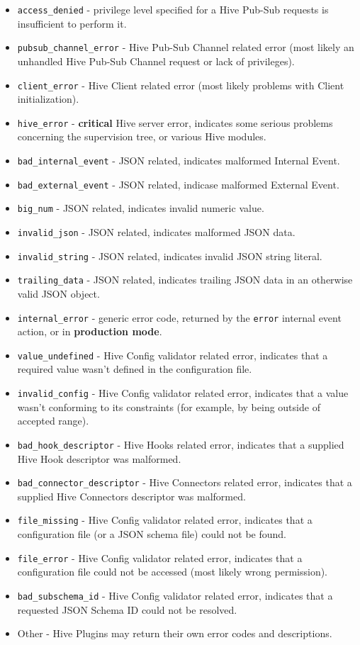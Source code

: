 \documentclass[a4paper]{article}
\begin{document}
\begin{itemize}
\item \texttt{access\_denied} - privilege level specified for a Hive Pub-Sub requests is insufficient to perform it.
\item \texttt{pubsub\_channel\_error} - Hive Pub-Sub Channel related error (most likely an unhandled Hive Pub-Sub Channel request or lack of privileges).
\item \texttt{client\_error} - Hive Client related error (most likely problems with Client initialization).
\item \texttt{hive\_error} - \textbf{critical} Hive server error, indicates some serious problems concerning the supervision tree, or various Hive modules.
\item \texttt{bad\_internal\_event} - JSON related, indicates malformed Internal Event.
\item \texttt{bad\_external\_event} - JSON related, indicase malformed External Event.
\item \texttt{big\_num} - JSON related, indicates invalid numeric value.
\item \texttt{invalid\_json} - JSON related, indicates malformed JSON data.
\item \texttt{invalid\_string} - JSON related, indicates invalid JSON string literal.
\item \texttt{trailing\_data} - JSON related, indicates trailing JSON data in an otherwise valid JSON object.
\item \texttt{internal\_error} - generic error code, returned by the \texttt{error} internal event action, or in \textbf{production mode}.
\item \texttt{value\_undefined} - Hive Config validator related error, indicates that a required value wasn't defined in the configuration file.
\item \texttt{invalid\_config} - Hive Config validator related error, indicates that a value wasn't conforming to its constraints (for example, by being outside of accepted range).
\item \texttt{bad\_hook\_descriptor} - Hive Hooks related error, indicates that a supplied Hive Hook descriptor was malformed.
\item \texttt{bad\_connector\_descriptor} - Hive Connectors related error, indicates that a supplied Hive Connectors descriptor was malformed.
\item \texttt{file\_missing} - Hive Config validator related error, indicates that a configuration file (or a JSON schema file) could not be found.
\item \texttt{file\_error} - Hive Config validator related error, indicates that a configuration file could not be accessed (most likely wrong permission).
\item \texttt{bad\_subschema\_id} - Hive Config validator related error, indicates that a requested JSON Schema ID could not be resolved.
\item Other - Hive Plugins may return their own error codes and descriptions.
\end{itemize}
\end{document}
